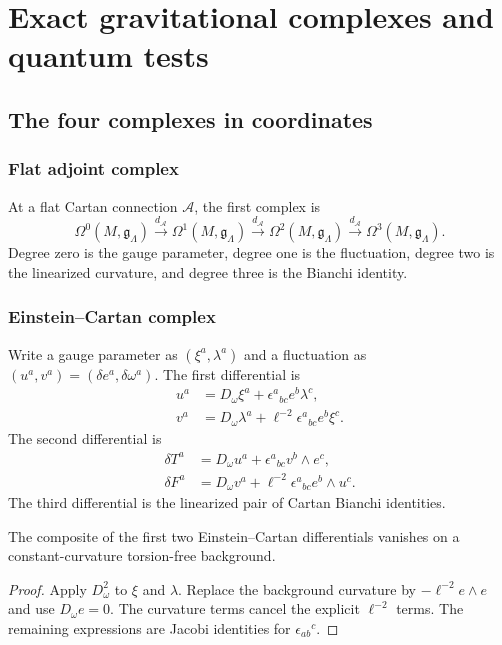 \part{Exact gravitational complexes and quantum tests}

\chapter{The four complexes in coordinates}
\section{Flat adjoint complex}
At a flat Cartan connection $\mathcal A$, the first complex is
\[
 \Omega^0(M,\mathfrak g_\Lambda)
 \xrightarrow{d_{\mathcal A}}
 \Omega^1(M,\mathfrak g_\Lambda)
 \xrightarrow{d_{\mathcal A}}
 \Omega^2(M,\mathfrak g_\Lambda)
 \xrightarrow{d_{\mathcal A}}
 \Omega^3(M,\mathfrak g_\Lambda).
\]
Degree zero is the gauge parameter, degree one is the fluctuation, degree two is the linearized curvature, and degree three is the Bianchi identity.

\section{Einstein--Cartan complex}
Write a gauge parameter as $(\xi^a,\lambda^a)$ and a fluctuation as $(u^a,v^a)=(\delta e^a,\delta\omega^a)$.  The first differential is
\[
 \begin{aligned}
 u^a&=D_\omega\xi^a+\epsilon^a{}_{bc}e^b\lambda^c,\\
 v^a&=D_\omega\lambda^a+\ell^{-2}\epsilon^a{}_{bc}e^b\xi^c.
 \end{aligned}
\]
The second differential is
\[
 \begin{aligned}
 \delta T^a&=D_\omega u^a+\epsilon^a{}_{bc}v^b\wedge e^c,\\
 \delta F^a&=D_\omega v^a+\ell^{-2}\epsilon^a{}_{bc}e^b\wedge u^c.
 \end{aligned}
\]
The third differential is the linearized pair of Cartan Bianchi identities.

\begin{proposition}
The composite of the first two Einstein--Cartan differentials vanishes on a constant-curvature torsion-free background.
\end{proposition}
\begin{proof}
Apply $D_\omega^2$ to $\xi$ and $\lambda$.  Replace the background curvature by $-\ell^{-2}e\wedge e$ and use $D_\omega e=0$.  The curvature terms cancel the explicit $\ell^{-2}$ terms.  The remaining expressions are Jacobi identities for $\epsilon_{ab}{}^c$.
\end{proof}

